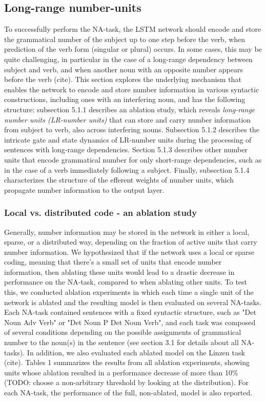 \subsection{Long-range number-units}
To successfully perform the NA-task, the LSTM network should encode and store the grammatical number of the subject up to one step before the verb, when prediction of the verb form (singular or plural) occurs. 
In some cases, this may be quite challenging, in particular in the case of a long-range dependency between subject and verb, and when another noun with an opposite number appears before the verb (cite). 
This section explores the underlying mechanism that enables the network to encode and store number information in various syntactic constructions, including ones with an interfering noun, and has the following structure: subsection 5.1.1 describes an ablation study, which reveals \textit{long-range number units (LR-number units)} that can store and carry number information from subject to verb, also across interfering nouns. 
Subsection 5.1.2 describes the intricate gate and state dynamics of LR-number units during the processing of sentences with long-range dependencies. 
Section 5.1.3 describes other number units that encode grammatical number for only short-range dependencies, such as in the case of a verb immediately following a subject. 
Finally, subsection 5.1.4 characterizes the structure of the efferent weights of number units, which propagate number information to the output layer.

\subsubsection{Local vs. distributed code - an ablation study}
Generally, number information may be stored in the network in either a local, sparse, or a distributed way, depending on the fraction of active units that carry number information. 
We hypothesized that if the network uses a local or sparse coding, meaning that there's a small set of units that encode number information, then ablating these units would lead to a drastic decrease in performance on the NA-task, compared to when ablating other units. 
To test this, we conducted ablation experiments in which each time a single unit of the network is ablated and the resulting model is then evaluated on several NA-tasks. 
Each NA-task contained sentences with a fixed syntactic structure, such as "Det Noun Adv Verb" or "Det Noun P Det Noun Verb", and each task was composed of several conditions depending on the possible assignments of grammatical number to the noun(s) in the sentence (see section 3.1 for details about all NA-tasks). 
In addition, we also evaluated each ablated model on the Linzen task (cite). 
Tables 1 summarizes the results from all ablation experiments, showing units whose ablation resulted in a performance decrease of more than 10\% (TODO: choose a non-arbitrary threshold by looking at the distribution). 
For each NA-task, the performance of the full, non-ablated, model is also reported.


